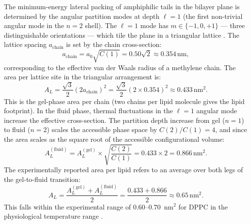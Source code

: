 \documentclass[11pt,twocolumn,a4paper]{article}
\theoremstyle{definition}
\theoremstyle{remark}
\begin{document}
The minimum-energy lateral packing of amphiphilic tails in the bilayer plane
is determined by the angular partition modes at depth $\ell = 1$ (the first
non-trivial angular mode in the $n = 2$ shell). The $\ell = 1$ mode has
$m \in \{-1, 0, +1\}$ — three distinguishable orientations — which tile the
plane in a triangular lattice \citep{safran1994}. The lattice spacing
$a_{\text{chain}}$ is set by the chain cross-section:
\begin{equation}
a_{\text{chain}} = a_0 \sqrt{C(1)} = 0.50\sqrt{2} \approx 0.354\,\text{nm},
\label{eq:chain_radius}
\end{equation}
corresponding to the effective van der Waals radius of a methylene chain.
The area per lattice site in the triangular arrangement is:
\begin{equation}
A_L = \frac{\sqrt{3}}{2}(2a_{\text{chain}})^2
    = \frac{\sqrt{3}}{2}(2 \times 0.354)^2 \approx 0.433\,\text{nm}^2.
\label{eq:area_gel}
\end{equation}
This is the gel-phase area per chain (two chains per lipid molecule gives
the lipid footprint). In the fluid phase, thermal fluctuations in the
$\ell = 1$ angular mode increase the effective cross-section.
The partition depth increase from gel ($n=1$) to fluid ($n=2$) scales the
accessible phase space by $C(2)/C(1) = 4$, and since the area scales as
the square root of the accessible configurational volume:
\begin{equation}
A_L^{(\text{fluid})} = A_L^{(\text{gel})} \times \sqrt{\frac{C(2)}{C(1)}}
= 0.433 \times 2 = 0.866\,\text{nm}^2.
\label{eq:area_fluid}
\end{equation}
The experimentally reported area per lipid \citep{nagle2000} refers to
an average over both legs of the gel-to-fluid transition:
\begin{equation}
A_L = \frac{A_L^{(\text{gel})} + A_L^{(\text{fluid})}}{2}
= \frac{0.433 + 0.866}{2} \approx 0.65\,\text{nm}^2.
\label{eq:area_mean}
\end{equation}
This falls within the experimental range of $0.60$--$0.70$~nm$^2$
for DPPC in the physiological temperature range \citep{nagle2000, bloom1991}.
\end{document}
